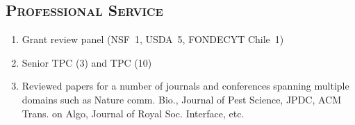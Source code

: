\documentclass[margin,10pt]{res} %
\begin{document}
\begin{resume}
\section{\textnormal{\textsc{Professional Service}}}
\begin{enumerate}[$\circ$]
    \iftoggle{compact}{}{
    \item Professional service: 
    \begin{itemize}
    }
        \item Grant review panel (NSF~1, USDA~5, FONDECYT Chile~1)
        \item Senior TPC (3) and TPC (10)
        \item Reviewed papers for a number of journals and conferences
        spanning multiple domains such as Nature comm. Bio., Journal of
        Pest Science, JPDC, ACM Trans. on Algo, Journal of Royal Soc.
        Interface, etc.
        \iftoggle{compact}{}{
    \end{itemize}
    \item Biocomplexity Institute \& Initiative:
    \begin{itemize}
        \item Student and postdoc hiring committee in NSSAC 2018--2020.
        \item Student and postdoc hiring committee in NDSSL 2017--2018.
\item Member of graduate students admission team in NDSSL for the Fall'16
admissions
    \end{itemize}
}
\end{enumerate}

\iftoggle{compact}{}{
}
\end{resume}
\end{document}
